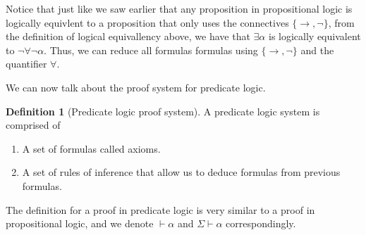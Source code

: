 \documentclass[11pt,a4paper]{article}
\theoremstyle{definition}
\newtheorem{definition}{Definition}[section]
\theoremstyle{plain}
\renewcommand{\implies}{\rightarrow}
\begin{document}
  Notice that just like we saw earlier that any proposition in
  propositional logic is logically equivlent to a proposition that
  only uses the connectives $\{\implies, \neg\}$,
  from the definition of logical equivallency above, we have that
  $\exists \alpha$ is logically equivalent to $\neg \forall \neg \alpha$.
  Thus, we can reduce all formulas formulas using $\{\implies, \neg\}$
  and the quantifier $\forall$.

  We can now talk about the proof system for predicate logic.
  
  \begin{definition}[Predicate logic proof system]
    A predicate logic system is comprised of
    \begin{enumerate}
      \item[(1)] A set of formulas called axioms.
      \item[(2)] A set of rules of inference that allow us to deduce
        formulas from previous formulas.
    \end{enumerate}
  \end{definition}
  
  The definition for a proof in predicate logic is very similar to a
  proof in propositional logic, and we denote $\vdash \alpha$ and
  $\Sigma \vdash \alpha$ correspondingly.
\end{document}
